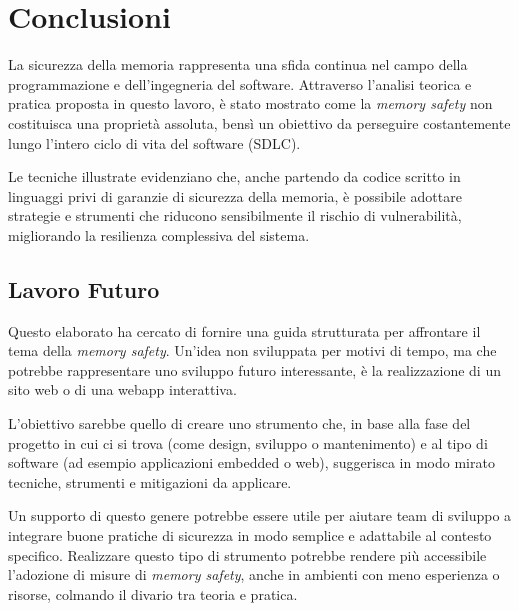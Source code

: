\chapter{Conclusioni}
\label{cha:conclusioni}

La sicurezza della memoria rappresenta una sfida continua nel campo della
programmazione e dell'ingegneria del software. Attraverso l'analisi teorica e pratica
proposta in questo lavoro, è stato mostrato come la \textit{memory safety} non costituisca
una proprietà assoluta, bensì un obiettivo da perseguire costantemente lungo l'intero
ciclo di vita del software (SDLC).

Le tecniche illustrate evidenziano che, anche partendo da codice scritto in linguaggi
privi di garanzie di sicurezza della memoria, è possibile adottare strategie e
strumenti che riducono sensibilmente il rischio di vulnerabilità, migliorando la
resilienza complessiva del sistema.

\section{Lavoro Futuro}
\label{sec:lavoro_futuro}

Questo elaborato ha cercato di fornire una guida strutturata per affrontare il
tema della \textit{memory safety}. Un'idea non sviluppata per motivi di tempo, ma
che potrebbe rappresentare uno sviluppo futuro interessante, è la realizzazione
di un sito web o di una webapp interattiva.

L'obiettivo sarebbe quello di creare uno strumento che, in base alla fase del progetto
in cui ci si trova (come design, sviluppo o mantenimento) e al tipo di software
(ad esempio applicazioni embedded o web), suggerisca in modo mirato tecniche,
strumenti e mitigazioni da applicare.

Un supporto di questo genere potrebbe essere utile per aiutare team di sviluppo
a integrare buone pratiche di sicurezza in modo semplice e adattabile al
contesto specifico. Realizzare questo tipo di strumento potrebbe rendere più accessibile
l'adozione di misure di \textit{memory safety}, anche in ambienti con meno esperienza
o risorse, colmando il divario tra teoria e pratica.